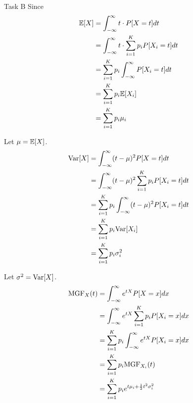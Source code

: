 \begin{task}{Task B}
	Since
	\begin{align}
		\mathbb{E}[X] & = \int_{-\infty}^{\infty} t\cdot P[X=t]dt                    \\
		      & = \int_{-\infty}^{\infty} t\cdot \sum_{i=1}^K p_iP[X_i=t] dt \\
		      & = \sum_{i=1}^K p_i \int_{-\infty}^{\infty} P[X_i = t] dt     \\
		      & = \sum_{i=1}^K p_i \mathbb{E}[X_i]                                   \\
		      & = \sum_{i=1}^K p_i\mu_i
	\end{align}

	Let $\mu = \mathbb{E}[X]$.
	\begin{align}
		\text{Var}[X] & = \int_{-\infty}^{\infty} (t-\mu)^2 P[X=t] dt                    \\
		        & = \int_{-\infty}^{\infty} (t-\mu)^2 \sum_{i=1}^K p_iP[X_i=t] dt  \\
		        & = \sum_{i=1}^K p_i \int_{-\infty}^{\infty} (t-\mu)^2 P[X_i=t] dt \\
		        & = \sum_{i=1}^K p_i \text{Var}[X_i]                                     \\
		        & = \sum_{i=1}^K p_i\sigma_i^2
	\end{align}

	Let $\sigma^2 = \text{Var}[X]$.
	\begin{align}
		\text{MGF}_X(t) & = \int_{-\infty}^{\infty} e^{tX}P[X=x]dx                     \\
		          & = \int_{-\infty}^{\infty} e^{tX} \sum_{i=1}^K p_iP[X_i=x] dx \\
		          & = \sum_{i=1}^K p_i \int_{-\infty}^{\infty} e^{tX}P[X_i=x] dx \\
		          & = \sum_{i=1}^K p_i\text{MGF}_{X_i}(t)                              \\
		          & = \sum_{i=1}^K p_i e^{t\mu_i + \frac{1}{2}t^2\sigma_i^2}
	\end{align}

\end{task}


